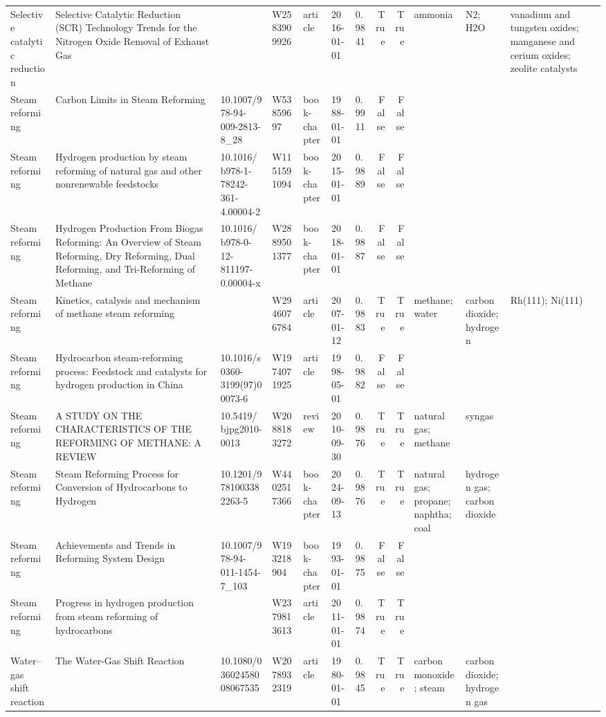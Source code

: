 \begin{tabular}{lllllllrrlll}
Selective catalytic reduction & Selective Catalytic Reduction (SCR) Technology Trends for the Nitrogen Oxide Removal of Exhaust Gas &  & W2583909926 & article & 2016-01-01 & 0.9841 & True & True & ammonia & N2; H2O & vanadium and tungsten oxides; manganese and cerium oxides; zeolite catalysts \\
Steam reforming & Carbon Limits in Steam Reforming & 10.1007/978-94-009-2813-8\_28 & W53859697 & book-chapter & 1988-01-01 & 0.9911 & False & False &  &  &  \\
Steam reforming & Hydrogen production by steam reforming of natural gas and other nonrenewable feedstocks & 10.1016/b978-1-78242-361-4.00004-2 & W1151591094 & book-chapter & 2015-01-01 & 0.9889 & False & False &  &  &  \\
Steam reforming & Hydrogen Production From Biogas Reforming: An Overview of Steam Reforming, Dry Reforming, Dual Reforming, and Tri-Reforming of Methane & 10.1016/b978-0-12-811197-0.00004-x & W2889501377 & book-chapter & 2018-01-01 & 0.9887 & False & False &  &  &  \\
Steam reforming & Kinetics, catalysis and mechanism of methane steam reforming &  & W2946076784 & article & 2007-01-12 & 0.9883 & True & True & methane; water & carbon dioxide; hydrogen & Rh(111); Ni(111) \\
Steam reforming & Hydrocarbon steam-reforming process: Feedstock and catalysts for hydrogen production in China & 10.1016/s0360-3199(97)00073-6 & W1974071925 & article & 1998-05-01 & 0.9882 & False & False &  &  &  \\
Steam reforming & A STUDY ON THE CHARACTERISTICS OF THE REFORMING OF METHANE: A REVIEW & 10.5419/bjpg2010-0013 & W2088183272 & review & 2010-09-30 & 0.9876 & True & True & natural gas; methane & syngas &  \\
Steam reforming & Steam Reforming Process for Conversion of Hydrocarbons to Hydrogen & 10.1201/9781003382263-5 & W4402517366 & book-chapter & 2024-09-13 & 0.9876 & True & True & natural gas; propane; naphtha; coal & hydrogen gas; carbon dioxide &  \\
Steam reforming & Achievements and Trends in Reforming System Design & 10.1007/978-94-011-1454-7\_103 & W193218904 & book-chapter & 1993-01-01 & 0.9875 & False & False &  &  &  \\
Steam reforming & Progress in hydrogen production from steam reforming of hydrocarbons &  & W2379813613 & article & 2011-01-01 & 0.9874 & True & True &  &  &  \\
Water–gas shift reaction & The Water-Gas Shift Reaction & 10.1080/03602458008067535 & W2078932319 & article & 1980-01-01 & 0.9845 & True & True & carbon monoxide; steam & carbon dioxide; hydrogen gas &  \\

\end{tabular}

